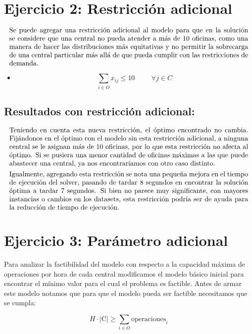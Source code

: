 \documentclass{article}
\begin{document}
\section*{Ejercicio 2: Restricción adicional}
\[
\parbox{\textwidth}{Se puede agregar una restricción adicional al modelo para que en la solución se considere que una central no pueda atender a más de 10 oficinas, como una manera de hacer las distribuciones más equitativas y no permitir la sobrecarga de una central particular más allá de que pueda cumplir con las restricciones de demanda.}
\]


\begin{itemize}
    \item {}
    \[
   \sum_{i \in O} x_{ij} \leq 10 \hspace{1cm}\forall j \in C
    \]
\end{itemize}
\subsection*{Resultados con restricción adicional:}
\[
\parbox{\textwidth}{Teniendo en cuenta esta nueva restricción, el óptimo encontrado no cambia. Fijándonos en el óptimo con el modelo sin esta restricción adicional, a ninguna central se le asignan más de 10 oficinas, por lo que esta restricción no afecta al óptimo. Si se pusiera una menor cantidad de oficinas máximas a las que puede abastecer una central, ya nos encontraríamos con otro caso distinto.}
\]
\[
\parbox{\textwidth}{Igualmente, agregando esta restricción se nota una pequeña mejora en el tiempo de ejecución del solver, pasando de tardar 8 segundos en encontrar la solución óptima a tardar 7 segundos. Si bien no parece muy significante, con mayores instancias o cambios en los datasets, esta restricción podría ser de ayuda para la reducción de tiempo de ejecución.}
\]

\section*{Ejercicio 3: Parámetro adicional}

Para analizar la factibilidad del modelo con respecto a la capacidad máxima de operaciones por hora de cada central modificamos el modelo básico inicial para encontrar el mínimo valor para el cual el problema es factible. 
Antes de armar este modelo notamos que para que el modelo pueda ser factible necesitamos que se cumpla:

\[
H \cdot \lvert \text{C} \rvert \geq \sum_{i \in O} \text{operaciones}_i \tag{1} 
\]
\end{document}
